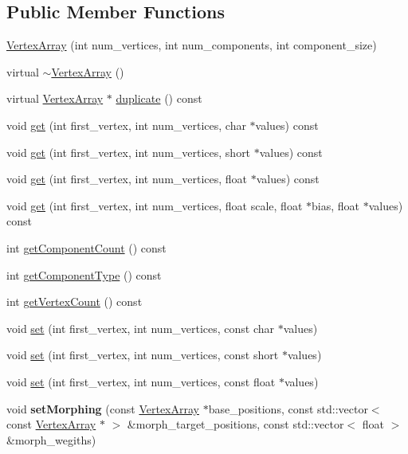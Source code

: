 \subsection*{Public Member Functions}
\begin{CompactItemize}
\item 
\hyperlink{classm3g_1_1VertexArray_5f38e30d23b5dc34b223e749e8afd0d0}{VertexArray} (int num\_\-vertices, int num\_\-components, int component\_\-size)
\item 
virtual \hyperlink{classm3g_1_1VertexArray_267fa63cb2f4216729437dc826415911}{$\sim$VertexArray} ()
\item 
virtual \hyperlink{classm3g_1_1VertexArray}{VertexArray} $\ast$ \hyperlink{classm3g_1_1VertexArray_f0dc6a5510bf837ef48129f344d666a8}{duplicate} () const 
\item 
void \hyperlink{classm3g_1_1VertexArray_9d1b801a7c196a07553a5ef4a5473573}{get} (int first\_\-vertex, int num\_\-vertices, char $\ast$values) const 
\item 
void \hyperlink{classm3g_1_1VertexArray_575822f60d7b5e74ed51e94851123038}{get} (int first\_\-vertex, int num\_\-vertices, short $\ast$values) const 
\item 
void \hyperlink{classm3g_1_1VertexArray_79b1ffd7586fe23fb5e31661e4d296e3}{get} (int first\_\-vertex, int num\_\-vertices, float $\ast$values) const 
\item 
void \hyperlink{classm3g_1_1VertexArray_1adedf59e0c6a047242a3914ca52b929}{get} (int first\_\-vertex, int num\_\-vertices, float scale, float $\ast$bias, float $\ast$values) const 
\item 
int \hyperlink{classm3g_1_1VertexArray_7016f51d2788e78fdd736efd040f5e5e}{getComponentCount} () const 
\item 
int \hyperlink{classm3g_1_1VertexArray_9b7b78fbff0603779ec6bdd2a323c939}{getComponentType} () const 
\item 
int \hyperlink{classm3g_1_1VertexArray_c1c9b7f5b0dcd9c0310d7e77e10081ba}{getVertexCount} () const 
\item 
void \hyperlink{classm3g_1_1VertexArray_c92a86c7439c8e38c7e5b69e3eca3ee1}{set} (int first\_\-vertex, int num\_\-vertices, const char $\ast$values)
\item 
void \hyperlink{classm3g_1_1VertexArray_f417744f1798d293c85c5e7fb6e1e846}{set} (int first\_\-vertex, int num\_\-vertices, const short $\ast$values)
\item 
void \hyperlink{classm3g_1_1VertexArray_24b9d666468f856b2bf09e450b20fdfb}{set} (int first\_\-vertex, int num\_\-vertices, const float $\ast$values)
\item 
\hypertarget{classm3g_1_1VertexArray_b5b62e478fb0964ca1c168714a66e562}{
void \textbf{setMorphing} (const \hyperlink{classm3g_1_1VertexArray}{VertexArray} $\ast$base\_\-positions, const std::vector$<$ const \hyperlink{classm3g_1_1VertexArray}{VertexArray} $\ast$ $>$ \&morph\_\-target\_\-positions, const std::vector$<$ float $>$ \&morph\_\-wegiths)}
\label{classm3g_1_1VertexArray_b5b62e478fb0964ca1c168714a66e562}


\end{CompactItemize}
